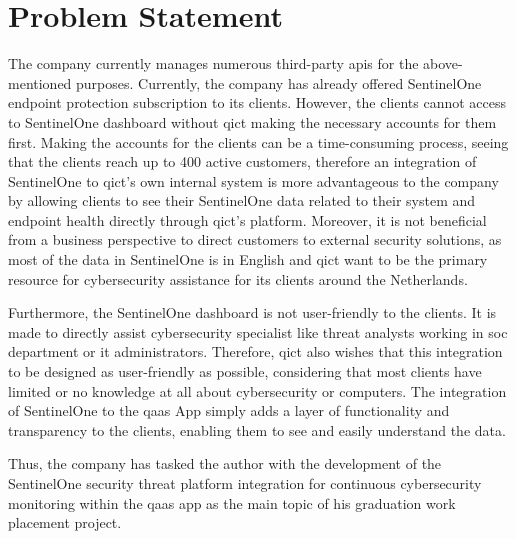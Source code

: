\section{Problem Statement}
The company currently manages numerous third-party \acrshort{api}s for the above-mentioned purposes.
Currently, the company has already offered SentinelOne endpoint protection subscription to its clients.
However, the clients cannot access to SentinelOne dashboard without \acrshort{qict} making the
necessary accounts for them first. Making the accounts for the clients can be a time-consuming process,
seeing that the clients reach up to 400 active customers, therefore an integration of SentinelOne
to \acrshort{qict}'s own internal system is more advantageous to the company by allowing clients to see
their SentinelOne data related to their system and endpoint health directly through \acrshort{qict}'s
platform. Moreover, it is not beneficial from a business perspective to direct customers to external
security solutions, as most of the data in SentinelOne is in English and \acrshort{qict} want to be the
primary resource for cybersecurity assistance for its clients around the Netherlands.

Furthermore, the SentinelOne dashboard is not user-friendly to the clients. It is made to directly assist cybersecurity
specialist like threat analysts working in \acrshort{soc} department or \acrshort{it} administrators. Therefore,
\acrshort{qict} also wishes that this integration to be designed as user-friendly as possible, considering
that most clients have limited or no knowledge at all about cybersecurity or computers. The integration of SentinelOne to the
\acrshort{qaas} App simply adds a layer of functionality and transparency to the clients, enabling them to see and easily
understand the data.

Thus, the company has tasked the author with the development of the SentinelOne security threat platform
integration for continuous cybersecurity monitoring within the \acrshort{qaas} app as the main topic of his
graduation work  placement project.

